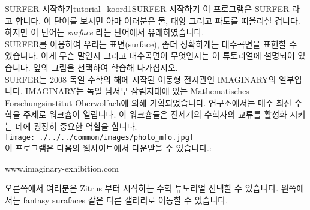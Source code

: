 \begin{surferIntroPage}{SURFER 시작하기}{tutorial_koord1}{SURFER 시작하기}
이 프로그램은 SURFER 라고 합니다. 이 단어를 보시면 아마 여러분은 물, 태양 그리고 파도를 떠올리실 겁니다. 하지만 이 단어는 {\it surface} 라는 단어에서 유래하였습니다.
\\
SURFER를 이용하여 우리는 표면(surface), 좀더 정확하게는 대수곡면을 표현할 수 있습니다. 이게 무슨 말인지 그리고 대수곡면이 무엇인지는 이 튜토리얼에 설명되어 있습니다. 옆의 그림을 선택하여 학습해 나가십시오.\\
SURFER는 2008 독일 수학의 해에 시작된 이동형 전시관인 IMAGINARY의 일부입니다. IMAGINARY는 독일 남서부 삼림지대에 있는 Mathematisches Forschungsinstitut Oberwolfach에 의해 기획되었습니다. 연구소에서는 매주 최신 수학을 주제로 워크숍이 열립니다. 이 워크숍들은 전세계의 수학자의 교류를 활성화 시키는 데에 굉장히 중요한 역할을 합니다.\\
\vspace{0.2cm} \hspace{3.5cm}\texttt{[image: ./../../common/images/photo\_mfo.jpg]}\\
이 프로그램은 다음의 웹사이트에서 다운받을 수 있습니다.: \\
\begin{centering}
www.imaginary-exhibition.com\\
\end{centering}
 \vspace{0.2cm}
오른쪽에서 여러분은 Zitrus 부터 시작하는 수학 튜토리얼 선택할 수 있습니다. 왼쪽에서는 fantasy surafaces 같은 다른 갤러리로 이동할 수 있습니다.
\end{surferIntroPage}
